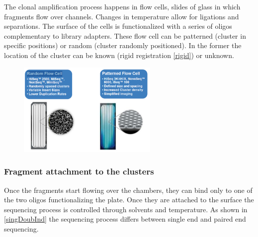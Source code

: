         The clonal amplification process happens in flow cells, slides of glass in which fragments flow over channels.
        Changes in temperature allow for ligations and separations.
        The surface of the cells is functionalized with a series of oligos complementary to library adapters.
        These flow cell can be patterned (cluster in specific positions) or random (cluster randomly positioned).
        In the former the location of the cluster can be known (rigid registration \ref{rigid}) or unknown.

        \begin{figure}[h]
            \centering
            \includegraphics[width=0.6\textwidth]{randomPatternCells}
            \caption{}
            \label{}
        \end{figure}

        \subsubsection{Fragment attachment to the clusters}
        Once the fragments start flowing over the chambers, they can bind only to one of the two oligos functionalizing the plate.
        Once they are attached to the surface the sequencing process is controlled through solvents and temperature.
        As shown in \ref{singDoubInd} the sequencing process differs between single end and paired end sequencing.

